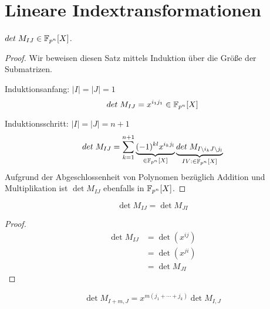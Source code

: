 \section{Lineare Indextransformationen}

\begin{lemma} \label{lemma:det-polynom}
    $det\; M_{IJ} \in \mathbb{F}_{p^n}[X]$.
\end{lemma}

\begin{proof}
    Wir beweisen diesen Satz mittels Induktion über die Größe der Submatrizen. 

    Induktionsanfang: $|I| = |J| = 1$
    \begin{equation*}
        det\; M_{IJ} = x^{i_1j_1} \in \mathbb{F}_{p^n}[X]
    \end{equation*}

    Induktionsschritt: $|I| = |J| = n+1$
    \begin{equation*}
        det\; M_{IJ} = \sum_{k=1}^{n+1} \underbrace{(-1)^{kl} x^{i_kj_l}}_{\in \mathbb{F}_{p^n}[X]} \underbrace{det\; M_{I\backslash i_k J \backslash j_l}}_{IV: \in \mathbb{F}_{p^n}[X]}
    \end{equation*}
    Aufgrund der Abgeschlossenheit von Polynomen bezüglich Addition und Multiplikation ist $\det M_{IJ}$ ebenfalls in $\mathbb{F}_{p^n}[X]$.
\end{proof}

\begin{lemma} \label{lemma:transpose}
    \begin{equation*}
        \det M_{IJ} = \det M_{JI}
    \end{equation*}
\end{lemma}

\begin{proof}
    \begin{align*}
        \det M_{IJ} &= \det (x^{ij}) \\
                    &= \det (x^{ji}) \\
                    &= \det M_{JI}
    \end{align*}
\end{proof}

\begin{lemma} \label{lemma:translation}
    \begin{equation*}
        \det{} M_{I+m,J} = x^{m(j_1+\cdots +j_k)} \det M_{I,J}
    \end{equation*}
\end{lemma}


